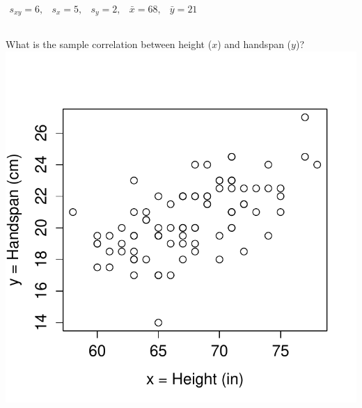\documentclass[handout]{beamer}
\begin{document}
\begin{frame}

$\begin{array}{ccccc} s_{xy} = 6,&s_x = 5,& s_y = 2,& \bar{x} = 68,& \bar{y} = 21\end{array}$
\begin{columns}[c]
\column{2.5in}
What is the sample correlation between height ($x$) and handspan ($y$)?
\column{1.8in}
\includegraphics[scale = 0.4]{./images/height_handspan1}
\end{columns}
\alert{$$\phantom{r = \frac{s_{xy}}{s_x s_y} = \frac{6}{4.5\times 2.2} \approx 0.6}$$}
\end{frame}
\end{document}
